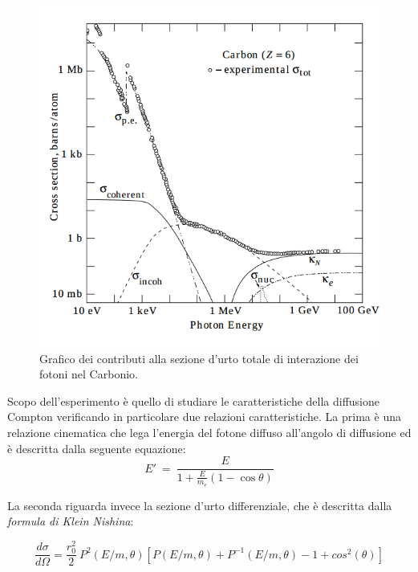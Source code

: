 \documentclass[5pt]{article}
\begin{document}
\begin{figure}
\begin{center}
\includegraphics[scale=0.5]{cross_sections}
\caption{Grafico dei contributi alla sezione d'urto totale di interazione dei fotoni nel Carbonio.}
\label{fig:cross_sections}
\end{center}
\end{figure}

Scopo dell'esperimento è quello di studiare le caratteristiche della diffusione Compton verificando in particolare due relazioni caratteristiche. La prima è una relazione cinematica che lega l'energia del fotone diffuso all'angolo di diffusione ed è descritta dalla seguente equazione: \\

\begin{equation}
E'\ = \ \frac{E}{1+\frac{E}{m_e}\left(1-\cos{\theta}\right)}
\label{eq:en_ang}
\end{equation}

La seconda riguarda invece la sezione d'urto differenziale, che è descritta dalla \textit{formula di Klein Nishina}:

\begin{equation}
\frac{d\sigma}{d\Omega} = \frac{r_0 ^2}{2} \ P^2(E/m , \theta) \left[ P(E/m, \theta) + P^{-1} (E/m, \theta) -1 + cos^2(\theta)\right]
\label{eq:klein}
\end{equation}
\end{document}
